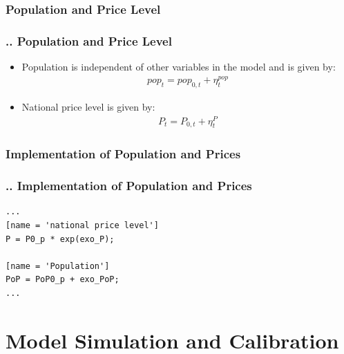 \documentclass[11pt,aspectratio=169]{beamer}
\begin{document}
\subsubsection{Population and Price Level}
\begin{frame}
\frametitle{{\thesection.\thesubsection.\thesubsubsection} Population and Price Level}
\scriptsize
\begin{itemize}
\item Population is independent of other variables in the model and is given by:
\begin{align*}
pop_{t} = pop_{0,t} + \eta^{pop}_{t}
\end{align*}
\item National price level is given by:
\begin{align*}
P_{t} = P_{0,t} + \eta^{P}_{t}
\end{align*}
\end{itemize}
\end{frame}

\subsubsection{Implementation of Population and Prices}
\begin{frame}[fragile]
\frametitle{{\thesection.\thesubsection.\thesubsubsection} Implementation of Population and Prices}

\begin{lstlisting}[frame = single]
...
[name = 'national price level']
P = P0_p * exp(exo_P);

[name = 'Population']
PoP = PoP0_p + exo_PoP;
...
\end{lstlisting}
\end{frame}




\section{Model Simulation and Calibration}
\end{document}
